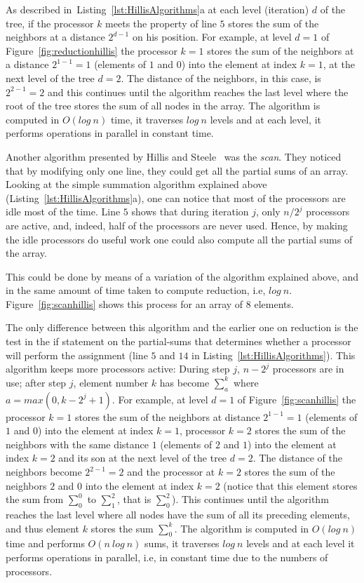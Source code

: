 \documentclass[Ingles]{ic-tese-v1}
\newcommand{\rfig}[1]{Figure~\ref{fig:#1}}
\newcommand{\tit}[1]{{\textit{#1}}}
\newcommand{\rlsts}[2]{Listing~\ref{lst:#1}{#2}}
\begin{document}
As described in~\rlsts{HillisAlgorithms}{a} at each level
(iteration) $d$ of the tree, if the processor $k$  meets the property of line $5$ 
stores the sum of the neighbors at a distance $2^{d-1}$ on his position.
For  example, at  level $d  = 1$  of \rfig{reductionhillis} the processor $k = 1$ stores the sum of the neighbors at a distance $2^{1-1} = 1$ (elements of $1$ and $0$) into the element at index $k = 1$, at the  next level of  the tree $d = 2$. The distance of the
neighbors, in this case, is  $2^{2-1} = 2$ and this continues until the algorithm reaches the last level where the root of the tree stores the sum of all nodes in the array. The algorithm is computed in $O(log\ n)$ time, it traverses $log\ n$ levels and at each level, it performs operations in parallel in constant time.

Another algorithm presented by Hillis and Steele~\cite{dataparallel} was the
\tit{scan}. They noticed that by modifying only one line, they could get all the partial
sums of an array.  Looking at the simple summation algorithm explained
above (\rlsts{HillisAlgorithms}{a}), one can notice that most of the
processors are idle most of the time. Line $5$ shows that during iteration $j$,
only $n/2^{j}$ processors are active, and, indeed, half of the processors are
never used. Hence, by making the idle processors do useful work
one could also compute all the partial sums of the array.

This could be done  by means of a variation of the  algorithm explained above, and  in the
same  amount of time taken to compute reduction, i.e, $log\ n$.
\rfig{scanhillis} shows this process for an array of 8
elements.

The only difference between this algorithm and the earlier one on reduction is
the test in the if statement on the partial-sums
that determines whether a processor will perform the assignment (line $5$ and $14$ in \rlsts{HillisAlgorithms}). This
algorithm keeps more processors active: During step $j$, $n - 2^{j}$ processors
are in use; after step $j$, element number $k$ has become $\sum_{a}^{k}$ where
$a = max(0, k - 2^{j} + 1)$. For  example, at  level $d  = 1$  of
\rfig{scanhillis} the processor $k = 1$ stores the sum of the neighbors at
distance $2^{1-1} = 1$ (elements of $1$ and $0$) into the element at index $k =
1$, processor $k = 2$ stores the sum of the neighbors with the same
distance $1$ (elements of $2$ and $1$) into the element at index $k = 2$ and
its son at the  next level of  the tree $d = 2$.
The distance of the neighbors become  $2^{2-1} = 2$ and the processor at $k = 2$ stores the
sum of the neighbors $2$ and $0$ into the element at index $k = 2$ (notice that this element stores the
sum from $\sum_{0}^{0}$ to $\sum_{1}^{2}$, that is $\sum_{0}^{2}$). This continues until
the algorithm reaches the last level where all nodes have the sum of all its preceding
elements, and thus  element $k$ stores the sum $\sum_{0}^{k}$.
The algorithm
is computed in $O(log\ n)$ time and performs $O(n\ log\ n)$ sums, it traverses $log\ n$ levels and at each level it
performs operations in parallel, i.e, in constant time due to the numbers of processors.
\end{document}
